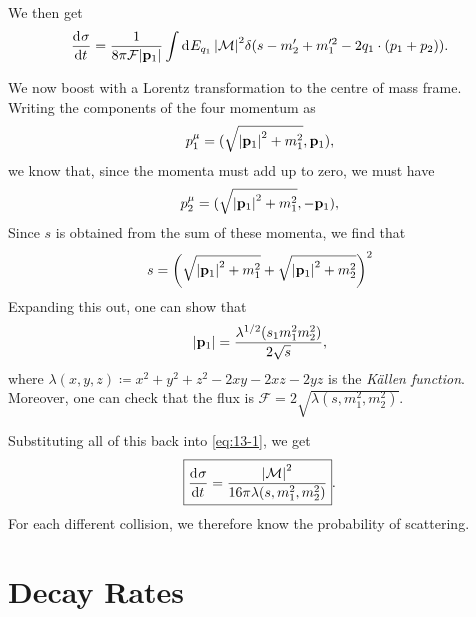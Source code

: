 We then get
\begin{equation}
  \label{eq:13-1}
  \dv[]{\sigma}{t} = \frac{1}{8\pi \mathcal{F} \abs{\vb{p}_1}} \int \dd[]{E_{q_1}} \abs{\mathcal{M}}^2 \delta(s - m_2' + m_1'^2 - 2q_1 \cdot (p_1 + p_2)).
\end{equation}

We now boost with a Lorentz transformation to the centre of mass frame.
Writing the components of the four momentum as
\begin{equation}
  p_1^{\mu} = (\sqrt{\abs{\vb{p}_1}^2 + m_1^2}, \vb{p}_1),
\end{equation}
we know that, since the momenta must add up to zero, we must have
\begin{equation}
  p_2^{\mu} = (\sqrt{\abs{\vb{p}_1}^2 + m_1^2}, -\vb{p}_1),
\end{equation}
Since $s$ is obtained from the sum of these momenta, we find that
\begin{equation}
  s = \qty(\sqrt{\abs{\vb{p}_1}^2 + m_1^2} + \sqrt{\abs{\vb{p}_1}^2 + m_2^2})^2
\end{equation}
Expanding this out, one can show that 
\begin{equation}
  \abs{\vb{p}_1} = \frac{\lambda^{1/2} (s_1 m_1^2 m_2^2)}{2 \sqrt{s}},
\end{equation}
where $\lambda(x, y, z) \coloneqq x^2 + y^2 + z^2 - 2xy - 2xz- 2yz$ is the \emph{Källen function}.
Moreover, one can check that the flux is $\mathcal{F} = 2 \sqrt{\lambda(s, m_1^2, m_2^2)}$.

Substituting all of this back into \eqref{eq:13-1}, we get
\begin{equation}
  \boxed{\dv[]{\sigma}{t} = \frac{\abs{\mathcal{M}}^2}{ 16 \pi \lambda (s, m_1^2, m_2^2)}}.
\end{equation}
For each different collision, we therefore know the probability of scattering.

\section{Decay Rates}%
\label{sec:decay_rates}


